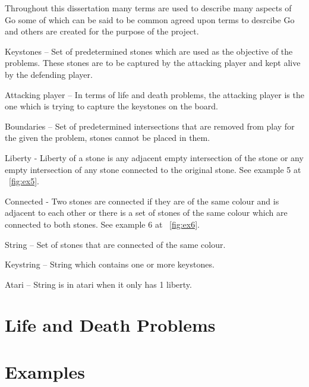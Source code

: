 \documentclass{l4proj}
\begin{document}
Throughout this dissertation many terms are used to describe many aspects of Go some of which can be said to be common agreed upon terms to desrcibe Go and others are created for the purpose of the project.

\noindent Keystones – Set of predetermined stones which are used as the objective of the problems. These stones are to be captured by the attacking player and kept alive by the defending player.



\noindent Attacking player – In terms of life and death problems, the attacking player is the one which is trying to capture the keystones on the board.

\noindent Boundaries – Set of predetermined intersections that are removed from play for the given the problem, stones cannot be placed in them.

\noindent Liberty -  Liberty of a stone is any adjacent empty intersection of the stone or any empty intersection of any stone connected to the original stone. See example 5 at ~\autoref{fig:ex5}.

\noindent Connected - Two stones are connected if they are of the same colour and is adjacent to each other or there is a set of stones of the same colour which are connected to both stones. See example 6 at ~\autoref{fig:ex6}.

\noindent String – Set of stones that are connected of the same colour.

\noindent Keystring – String which contains one or more keystones.

\noindent Atari – String is in atari when it only has 1 liberty.


\section{Life and Death Problems}


\section{Examples}
\end{document}
